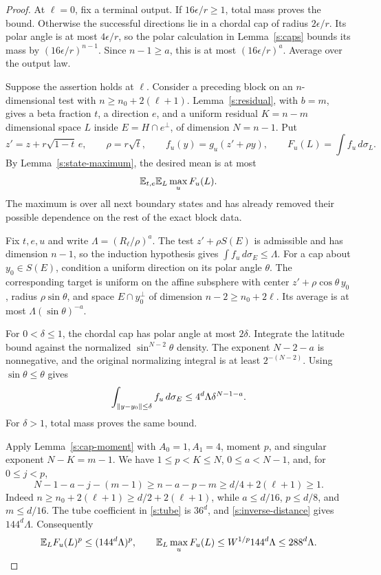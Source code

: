 \begin{proof}
At \(\ell=0\), fix a terminal output. If \(16\epsilon/r\ge1\),
total mass proves the bound. Otherwise the successful directions lie
in a chordal cap of radius \(2\epsilon/r\). Its polar angle is at most
\(4\epsilon/r\), so the polar calculation in Lemma~\ref{s:caps}
bounds its mass by \((16\epsilon/r)^{n-1}\).
Since \(n-1\ge a\), this is at most \((16\epsilon/r)^a\).
Average over the output law.

Suppose the assertion holds at \(\ell\). Consider a preceding block
on an \(n\)-dimensional test with \(n\ge n_0+2(\ell+1)\).
Lemma~\ref{s:residual}, with \(b=m\), gives a beta fraction \(t\),
a direction \(e\), and a uniform residual \(K=n-m\) dimensional
space \(L\) inside \(E=H\cap e^\perp\), of dimension \(N=n-1\).
Put
\[
 z'=z+r\sqrt{1-t}\,e,\qquad \rho=r\sqrt t,\qquad
 f_u(y)=g_u(z'+\rho y),\qquad F_u(L)=\int f_u\,d\sigma_L.
\]
By Lemma~\ref{s:state-maximum}, the desired mean is at most
\begin{equation}\label{s:affine-state-max}
 \mathbb E_{t,e}\mathbb E_L\max_u F_u(L).
\end{equation}
The maximum is over all next boundary states and has already removed
their possible dependence on the rest of the exact block data.

Fix \(t,e,u\) and write \(\Lambda=(R_\ell/\rho)^a\). The test
\(z'+\rho S(E)\) is admissible and has dimension \(n-1\), so the
induction hypothesis gives \(\int f_u\,d\sigma_E\le\Lambda\).
For a cap about \(y_0\in S(E)\), condition a uniform direction on
its polar angle \(\theta\). The corresponding target is uniform on
the affine subsphere with center \(z'+\rho\cos\theta\,y_0\), radius
\(\rho\sin\theta\), and space \(E\cap y_0^\perp\) of dimension
\(n-2\ge n_0+2\ell\). Its average is at most
\(\Lambda(\sin\theta)^{-a}\).

For \(0<\delta\le1\), the chordal cap has polar angle at most
\(2\delta\). Integrate the latitude bound against the normalized
\(\sin^{N-2}\theta\) density. The exponent \(N-2-a\) is
nonnegative, and the original normalizing integral is at least
\(2^{-(N-2)}\). Using \(\sin\theta\le\theta\) gives
\begin{equation}\label{s:affine-cap}
 \int_{\left\lVert y-y_0\right\rVert\le\delta}f_u\,d\sigma_E
 \le4^d\Lambda\delta^{N-1-a}.
\end{equation}
For \(\delta>1\), total mass proves the same bound.

Apply Lemma~\ref{s:cap-moment} with \(A_0=1,A_1=4\),
moment \(p\), and singular exponent \(N-K=m-1\). We have
\(1\le p<K\le N\), \(0\le a<N-1\), and, for \(0\le j<p\),
\[
 N-1-a-j-(m-1)
 \ge n-a-p-m
 \ge d/4+2(\ell+1)\ge1.
\]
Indeed \(n\ge n_0+2(\ell+1)\ge d/2+2(\ell+1)\), while
\(a\le d/16\), \(p\le d/8\), and \(m\le d/16\).
The tube coefficient in \eqref{s:tube} is \(36^d\), and
\eqref{s:inverse-distance} gives \(144^d\Lambda\). Consequently
\[
 \mathbb E_L F_u(L)^p\le(144^d\Lambda)^p,\qquad
 \mathbb E_L\max_uF_u(L)\le W^{1/p}144^d\Lambda\le288^d\Lambda.
\]


\end{proof}
